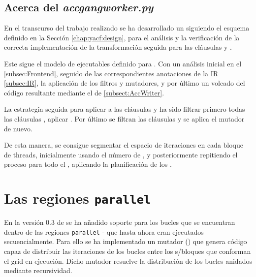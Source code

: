 

\subsection{Acerca del \driver{} \textit{accgangworker.py}}
\label{chap:optGPGPU:accgangworker}



En el transcurso del trabajo realizado se ha desarrollado un \driver{} siguiendo el 
esquema definido en la Sección \ref{chap:yacf:design}, para el análisis y la verificación 
de la correcta implementación de la transformación seguida para las cláusulas \gang{} y 
\worker{}.

Este \driver{} sigue el modelo de ejecutables definido para \yacf{}. Con un análisis 
inicial en el  \ref{subsec:Frontend}, seguido de las correspondientes 
anotaciones de la \ac{IR} \ref{subsec:IR}, la aplicación de los filtros y mutadores, y por 
último un volcado del código resultante mediante el \writer{} %
de \OpenACC{} \ref{subsect:AccWriter}.

La estrategia seguida para aplicar \tiling{} a las cláusulas \gang{} y \worker{} ha sido 
filtrar primero todas las cláusulas \worker{}, aplicar \tiling{}. Por último se filtran 
las cláusulas \worker{} y se aplica el mutador de nuevo.

De esta manera, se consigue segmentar el espacio de iteraciones en cada bloque de threads,
inicialmente usando el número de \worker{}, y posteriormente repitiendo el proceso para 
todo el \grid{}, aplicando la planificación de los \gang{}.

\section{Las regiones \texttt{parallel}}

En la versión 0.3 de \accULL{} se ha añadido soporte para los bucles que se encuentran 
dentro de las regiones \texttt{parallel} - que hasta ahora eran ejecutados 
secuencialmente. 
Para ello se ha implementado un mutador () que genera código 
capaz de 
distribuir las iteraciones de los bucles entre los \thread{}s/bloques que conforman el 
grid en ejecución. Dicho mutador resuelve la distribución de los bucles anidados mediante 
recursividad. 

